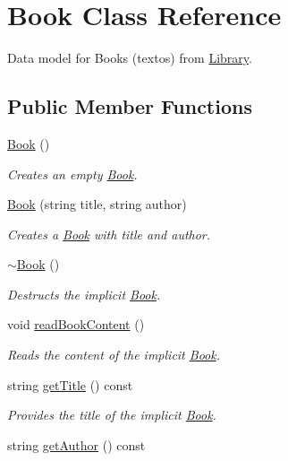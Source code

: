 \hypertarget{class_book}{}\section{Book Class Reference}
\label{class_book}


Data model for Books (textos) from \hyperlink{class_library}{Library}.  


\subsection*{Public Member Functions}
\begin{DoxyCompactItemize}
\item 
\hyperlink{class_book_a2eac9e235a08763158f78533f7a83e1f}{Book} ()
\begin{DoxyCompactList}\small\item\em Creates an empty \hyperlink{class_book}{Book}. \end{DoxyCompactList}\item 
\hyperlink{class_book_a98dad89c9f945e0d846c81ce7e459fbc}{Book} (string title, string author)
\begin{DoxyCompactList}\small\item\em Creates a \hyperlink{class_book}{Book} with title and author. \end{DoxyCompactList}\item 
\hyperlink{class_book_a0ba8eceb34ea1301bc08942e37824767}{$\sim$\+Book} ()
\begin{DoxyCompactList}\small\item\em Destructs the implicit \hyperlink{class_book}{Book}. \end{DoxyCompactList}\item 
void \hyperlink{class_book_a3e62d70f19bf6fa8ebef5556882b3ed7}{read\+Book\+Content} ()
\begin{DoxyCompactList}\small\item\em Reads the content of the implicit \hyperlink{class_book}{Book}. \end{DoxyCompactList}\item 
string \hyperlink{class_book_aa3dc09f8db785a89259a0e491292987d}{get\+Title} () const 
\begin{DoxyCompactList}\small\item\em Provides the title of the implicit \hyperlink{class_book}{Book}. \end{DoxyCompactList}\item 
string \hyperlink{class_book_a3bd4acccf78a82061fc6c78107757620}{get\+Author} () const 

\end{DoxyCompactItemize}
